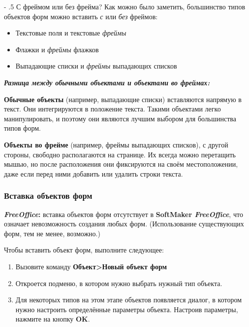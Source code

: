 ﻿\documentclass[a4paper,10pt]{article}
\makeatletter
\renewcommand\paragraph{%
   \@startsection{paragraph}{4}{0mm}%
      {-\baselineskip}%
      {.5\baselineskip}%
      {\normalfont\normalsize\bfseries}}
\makeatother
\begin{document}
\paragraph{С фреймом или без фрейма?}
Как можно было заметить, большинство типов объектов форм можно вставить \textit{с} или \textit{без} фреймов:

\begin{itemize}
 \item Текстовые поля и текстовые \textit{фреймы}
 \item Флажки и \textit{фреймы} флажков
 \item Выпадающие списки и \textit{фреймы} выпадающих списков
 \end{itemize}

 \textbf{\textit{Разница между обычными объектами и объектами во фреймах:}}
 
\textbf{Обычные объекты} (например, выпадающие списки) вставляются напрямую в текст. Они интегрируются в положение текста. Такими объектами легко манипулировать, и поэтому они являются лучшим выбором для большинства типов форм.

\textbf{Объекты во фрейме} (например, фреймы выпадающих списков), с другой стороны, свободно располагаются на странице. Их всегда можно перетащить мышью, но после расположения они фиксируются на своём местоположении, даже если перед ними добавить или удалить строки текста.

\subsubsection{Вставка объектов форм}
\begin{mdframed}[backgroundcolor=pink!50]
\textbf{\textit{FreeOffice}:} вставка объектов форм отсутствует в \textbf{SoftMaker \textit{FreeOffice}}, что означает невозможность создания любых форм. (Использование существующих форм, тем не менее, возможно.)
\end{mdframed}

Чтобы вставить объект форм, выполните следующее:

\begin{enumerate}
 \item Вызовите команду \textbf{Объект>Новый объект форм}
 \item Откроется подменю, в котором нужно выбрать нужный тип объекта.
 \item Для некоторых типов на этом этапе объектов появляется диалог, в котором нужно настроить определённые параметры объекта. Настроив параметры, нажмите на кнопку \textbf{OK}.
\end{enumerate}
\end{document}
